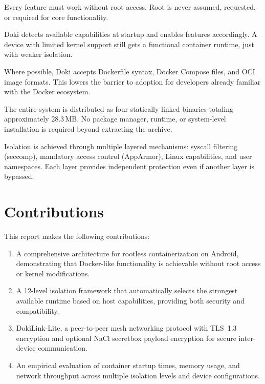 \begin{description}[leftmargin=*, style=nextline, font=\sffamily\bfseries]
  \item[Rootless by default.]
    Every feature must work without root access. Root is never assumed,
    requested, or required for core functionality.

  \item[Progressive enhancement.]
    Doki detects available capabilities at startup and enables features
    accordingly. A device with limited kernel support still gets a
    functional container runtime, just with weaker isolation.

  \item[Docker compatibility.]
    Where possible, Doki accepts Dockerfile syntax, Docker Compose
    files, and OCI image formats. This lowers the barrier to adoption
    for developers already familiar with the Docker ecosystem.

  \item[Single-binary distribution.]
    The entire system is distributed as four statically linked
    binaries totaling approximately 28.3\,MB. No package manager,
    runtime, or system-level installation is required beyond
    extracting the archive.

  \item[Security in depth.]
    Isolation is achieved through multiple layered mechanisms:
        syscall filtering (seccomp), mandatory access control
        (AppArmor), Linux capabilities, and user namespaces.
        Each layer provides independent protection even if another
        layer is bypassed.
\end{description}

\section{Contributions}
\label{sec:contributions}

This report makes the following contributions:

\begin{enumerate}[leftmargin=*, itemsep=4pt]
  \item A comprehensive architecture for rootless containerization
        on Android, demonstrating that Docker-like functionality is
        achievable without root access or kernel modifications.

  \item A 12-level isolation framework that automatically selects the
        strongest available runtime based on host capabilities,
        providing both security and compatibility.

  \item DokiLink-Lite, a peer-to-peer mesh networking protocol with
        TLS~1.3 encryption and optional NaCl secretbox payload
        encryption for secure inter-device communication.

  \item An empirical evaluation of container startup times, memory
        usage, and network throughput across multiple isolation levels
        and device configurations.
\end{enumerate}

